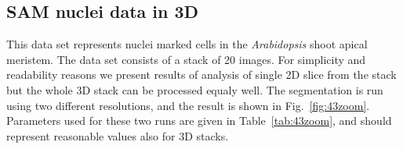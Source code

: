 \documentclass[a4paper,12pt]{article}
\begin{document}
\subsection{SAM nuclei data in 3D}
This data set represents nuclei marked cells in the \textit{Arabidopsis} shoot
apical meristem. The data set consists of a stack of 20 images. For simplicity
and readability reasons we present results of analysis of single 2D slice from
the stack but the whole 3D stack can be processed equaly well. The
segmentation is run using two different resolutions, and the result is shown
in Fig.~\ref{fig:43zoom}. Parameters used for these two runs are given in
Table~\ref{tab:43zoom}, and should represent reasonable values also for 3D
stacks.
%
\begin{figure}[h!]
\begin{center}
\\
\end{center}
\end{figure}
\end{document}
